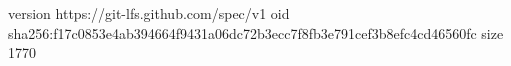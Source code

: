 version https://git-lfs.github.com/spec/v1
oid sha256:f17c0853e4ab394664f9431a06dc72b3ecc7f8fb3e791cef3b8efc4cd46560fc
size 1770

